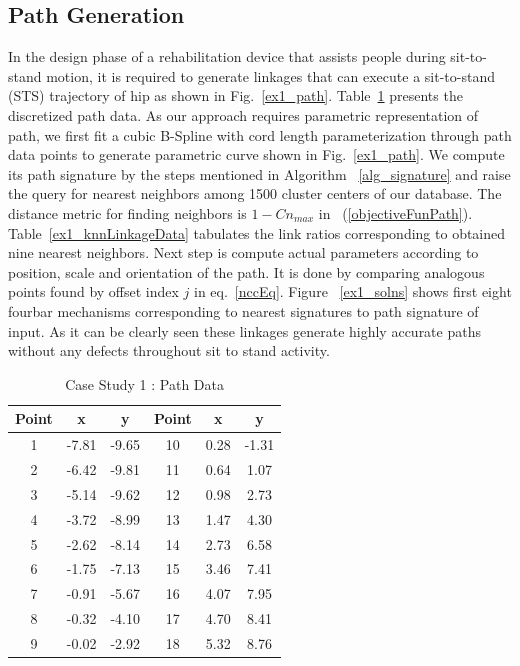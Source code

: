 \documentclass[twocolumn,10pt]{asme2e}
\newcommand{\req}[1]{(\ref{#1})}
\begin{document}
\subsection{Path Generation}
In the design phase of a rehabilitation device that assists people during sit-to-stand motion, it is required to generate linkages that can execute a sit-to-stand (STS) trajectory of hip as shown in Fig.~\ref{ex1_path}.
Table~\ref{hipPathTab} presents the discretized path data.
As our approach requires parametric representation of path, we first fit a cubic B-Spline with cord length parameterization through path data points to generate parametric curve shown in Fig.~\ref{ex1_path}.
We compute its path signature by the steps mentioned in Algorithm ~\ref{alg_signature} and raise the query for nearest neighbors among 1500 cluster centers of our database.
The distance metric for finding neighbors is $1-Cn_{max}$ in ~\req{objectiveFunPath}.
Table~\ref{ex1_knnLinkageData} tabulates the link ratios corresponding to obtained nine nearest neighbors.
Next step is compute actual parameters according to position, scale and orientation of the path.
It is done by comparing analogous points found by offset index $j$ in eq.~\ref{nccEq}.
Figure ~\ref{ex1_solns} shows first eight fourbar mechanisms corresponding to nearest signatures to path signature of input.
As it can be clearly seen these linkages generate highly accurate paths without any defects throughout sit to stand activity.

\begin{table}
\caption{Case Study 1 : Path Data}
\centering
\label{hipPathTab}
\begin{tabular}{cccccc}
\hline
Point & x & y & Point & x & y \\
\hline
1 & -7.81 & -9.65 & 10 & 0.28 & -1.31 \\
2 & -6.42 & -9.81 & 11 & 0.64 & 1.07 \\
3 & -5.14 & -9.62 & 12 & 0.98 & 2.73 \\
4 & -3.72 & -8.99 & 13 & 1.47 & 4.30 \\
5 & -2.62 & -8.14 & 14 & 2.73 & 6.58 \\
6 & -1.75 & -7.13 & 15 & 3.46 & 7.41 \\
7 & -0.91 & -5.67 & 16 & 4.07 & 7.95 \\
8 & -0.32 & -4.10 & 17 & 4.70 & 8.41 \\
9 & -0.02 & -2.92 & 18 & 5.32 & 8.76 \\
\end{tabular}
\end{table}
\end{document}
